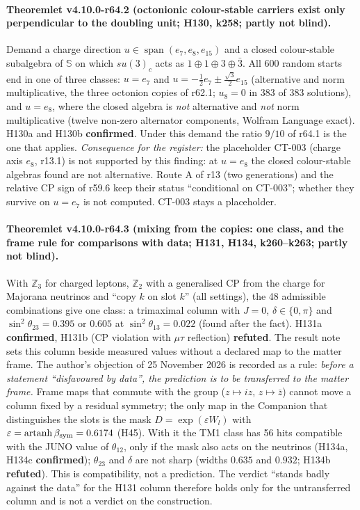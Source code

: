 \paragraph{Theoremlet v4.10.0-r64.2 (octonionic colour-stable carriers exist only perpendicular to the doubling unit; H130, k258; partly not blind).}
Demand a charge direction \(u\in\operatorname{span}(e_7,e_8,e_{15})\) and a closed colour-stable subalgebra of \(\mathbb S\) on which
\(su(3)_c\) acts as \(1\oplus1\oplus3\oplus\bar3\).  All 600 random starts end in one of three classes: \(u=e_7\) and
\(u=-\tfrac12e_7\pm\tfrac{\sqrt3}{2}e_{15}\) (alternative and norm multiplicative, the three octonion copies of r62.1; \(u_8=0\) in 383 of 383
solutions), and \(u=e_8\), where the closed algebra is \emph{not} alternative and \emph{not} norm multiplicative (twelve non-zero alternator
components, Wolfram Language exact).  H130a and H130b \textbf{confirmed}.  Under this demand the ratio \(9/10\) of r64.1 is the one that applies.
\emph{Consequence for the register:} the placeholder CT-003 (charge axis \(e_8\), r13.1) is not supported by this finding: at \(u=e_8\)
the closed colour-stable algebras found are not alternative.  Route A of r13 (two generations) and the relative CP sign of r59.6 keep their status ``conditional on
CT-003''; whether they survive on \(u=e_7\) is not computed.  CT-003 stays a placeholder.

\paragraph{Theoremlet v4.10.0-r64.3 (mixing from the copies: one class, and the frame rule for comparisons with data; H131, H134, k260--k263; partly not blind).}
With \(\mathbb Z_3\) for charged leptons, \(\mathbb Z_2\) with a generalised CP from the charge for Majorana neutrinos and ``copy \(k\) on slot
\(k\)'' (all settings), the 48 admissible combinations give one class: a trimaximal column with \(J=0\), \(\delta\in\{0,\pi\}\) and
\(\sin^2\theta_{23}=0.395\) or \(0.605\) at \(\sin^2\theta_{13}=0.022\) (found after the fact).  H131a \textbf{confirmed}, H131b (CP violation with
\(\mu\tau\) reflection) \textbf{refuted}.  The result note sets this column beside measured values without a declared map to the matter frame.
The author's objection of 25 November 2026 is recorded as a rule: \emph{before a statement ``disfavoured by data'', the prediction is to be
transferred to the matter frame.}  Frame maps that commute with the group (\(z\mapsto iz\), \(z\mapsto\bar z\)) cannot move a column fixed by a
residual symmetry; the only map in the Companion that distinguishes the slots is the mask \(D=\exp(\varepsilon W_l)\) with
\(\varepsilon=\operatorname{artanh}\beta_{\rm sym}=0.6174\) (H45).  With it the TM1 class has 56 hits compatible with the JUNO value of
\(\theta_{12}\), only if the mask also acts on the neutrinos (H134a, H134c \textbf{confirmed}); \(\theta_{23}\) and \(\delta\) are not sharp
(widths \(0.635\) and \(0.932\); H134b \textbf{refuted}).  This is compatibility, not a prediction.  The verdict ``stands badly against the data''
for the H131 column therefore holds only for the untransferred column and is not a verdict on the construction.


